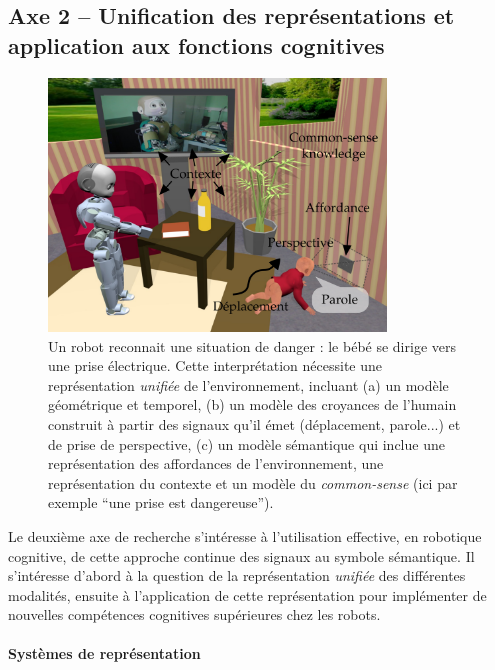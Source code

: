 \documentclass[a4paper]{article}
\begin{document}
\subsection*{Axe 2 -- Unification des représentations et application aux fonctions
cognitives}

\begin{figure}
    \centering
\includegraphics[width=0.8\textwidth]{figs/signaux}
\caption{\small Un robot reconnait une situation de danger : le bébé se dirige
    vers une prise électrique. Cette interprétation nécessite une représentation
    \emph{unifiée} de l'environnement, incluant (a) un modèle géométrique et
    temporel, (b) un modèle des croyances de l'humain construit à partir des
    signaux qu'il émet (déplacement, parole...) et de prise de perspective, (c)
    un modèle sémantique qui inclue une représentation des affordances de
    l'environnement, une représentation du contexte et un modèle du
    \emph{common-sense} (ici par exemple ``une prise est dangereuse'').}

\label{babyplug}
\end{figure}

Le deuxième axe de recherche s'intéresse à l'utilisation effective, en robotique
cognitive, de cette approche continue des signaux au symbole sémantique. Il
s'intéresse d'abord à la question de la représentation \emph{unifiée} des
différentes modalités, ensuite à l'application de cette représentation pour
implémenter de nouvelles compétences cognitives supérieures chez les robots.

\paragraph{Systèmes de représentation}
\end{document}
